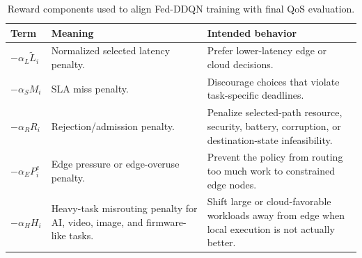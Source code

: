 \begin{table}[!t]
\centering
\caption{Reward components used to align Fed-DDQN training with final QoS evaluation.}
\label{tab:reward_terms}
\scriptsize
\begin{tabularx}{\textwidth}{@{}lXX@{}}
\toprule
Term & Meaning & Intended behavior \\
\midrule
$-\alpha_L \tilde{L}_i$ & Normalized selected latency penalty. & Prefer lower-latency edge or cloud decisions. \\
$-\alpha_S M_i$ & SLA miss penalty. & Discourage choices that violate task-specific deadlines. \\
$-\alpha_R R_i$ & Rejection/admission penalty. & Penalize selected-path resource, security, battery, corruption, or destination-state infeasibility. \\
$-\alpha_E P_i^e$ & Edge pressure or edge-overuse penalty. & Prevent the policy from routing too much work to constrained edge nodes. \\
$-\alpha_H H_i$ & Heavy-task misrouting penalty for AI, video, image, and firmware-like tasks. & Shift large or cloud-favorable workloads away from edge when local execution is not actually better. \\
\bottomrule
\end{tabularx}
\end{table}
